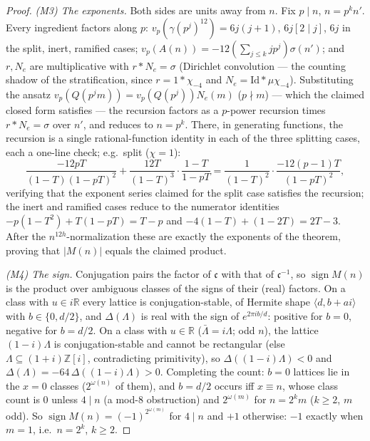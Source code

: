 \documentclass[11pt]{amsart}
\numberwithin{equation}{section}
\theoremstyle{plain}
\theoremstyle{definition}
\theoremstyle{remark}
\newcommand{\R}{\mathbb{R}}
\newcommand{\Z}{\mathbb{Z}}
\newcommand{\Zi}{\Z[i]}
\newcommand{\idealc}{\mathfrak{c}}
\newcommand{\sgn}{\operatorname{sign}}
\begin{document}
\begin{proof}
\emph{(M3) The exponents.}  Both sides are units away from $n$.  Fix
$p \mid n$, $n = p^kn'$.  Every ingredient factors along $p$:
$v_p(\gamma(p^j)^{12}) = 6j(j + 1)$, $6j[2 \mid j]$, $6j$ in the
split, inert, ramified cases; $v_p(A(n)) = -12(\sum_{j \le
k}jp^j)\sigma(n')$; and $r, N_e$ are multiplicative with $r * N_e =
\sigma$ (Dirichlet convolution --- the counting shadow of the
stratification, since $r = 1 * \chi_{-4}$ and $N_e = \mathrm{Id} *
\mu\chi_{-4}$).  Substituting the ansatz $v_p(Q(p^jm)) =
v_p(Q(p^j))N_e(m)$ ($p \nmid m$) --- which the claimed closed form
satisfies --- the recursion factors as a $p$-power recursion times
$r * N_e = \sigma$ over $n'$, and reduces to $n = p^k$.  There, in
generating functions, the recursion is a single rational-function
identity in each of the three splitting cases, each a one-line check;
e.g.\ split ($\chi = 1$):
\[
  \frac{-12pT}{(1 - T)(1 - pT)^2}
  + \frac{12T}{(1 - T)^3}\cdot\frac{1 - T}{1 - pT}
  = \frac{1}{(1 - T)^2}\cdot\frac{-12(p - 1)T}{(1 - pT)^2},
\]
verifying that the exponent series claimed for the split case
satisfies the recursion; the inert and ramified cases reduce to the
numerator identities $-p(1 - T^2) + T(1 - pT) = T - p$ and
$-4(1 - T) + (1 - 2T) = 2T - 3$.  After the $n^{12h}$-normalization
these are exactly the exponents of the theorem, proving that $|M(n)|$
equals the claimed product.

\emph{(M4) The sign.}  Conjugation pairs the factor of $\idealc$ with
that of $\idealc^{-1}$, so $\sgn M(n)$ is the product over ambiguous
classes of the signs of their (real) factors.  On a class with $u \in
i\R$ every lattice is conjugation-stable, of Hermite shape $\langle d,
b + ai\rangle$ with $b \in \{0, d/2\}$, and $\Delta(\Lambda)$ is real
with the sign of $e^{2\pi ib/d}$: positive for $b = 0$, negative for
$b = d/2$.  On a class with $u \in \R$ ($\bar\Lambda = i\Lambda$; odd
$n$), the lattice $(1 - i)\Lambda$ is conjugation-stable and cannot be
rectangular (else $\Lambda \subseteq (1 + i)\Zi$, contradicting
primitivity), so $\Delta((1 - i)\Lambda) < 0$ and $\Delta(\Lambda) =
-64\,\Delta((1 - i)\Lambda) > 0$.  Completing the count: $b = 0$
lattices lie in the $x = 0$ classes ($2^{\omega(n)}$ of them), and
$b = d/2$ occurs iff $x \equiv n$, whose class count is $0$ unless $4
\mid n$ (a mod-$8$ obstruction) and $2^{\omega(m)}$ for $n = 2^km$
($k \ge 2$, $m$ odd).  So $\sgn M(n) = (-1)^{2^{\omega(m)}}$ for
$4 \mid n$ and $+1$ otherwise: $-1$ exactly when $m = 1$, i.e.\ $n =
2^k$, $k \ge 2$.
\end{proof}
\end{document}
